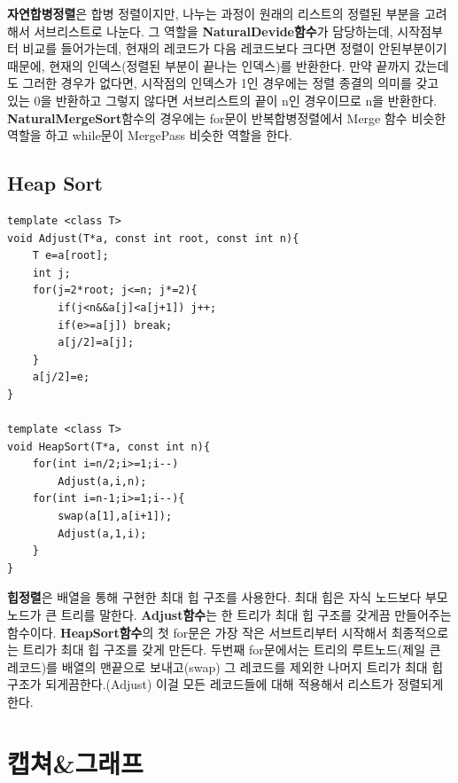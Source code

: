 \documentclass[a4paper,11pt]{article}
\begin{document}
\textbf{자연합병정렬}은 합병 정렬이지만, 나누는 과정이 원래의 리스트의 정렬된 부분을 고려해서 서브리스트로 나눈다. 그 역할을 \textbf{NaturalDevide함수}가 담당하는데, 시작점부터 비교를 들어가는데, 현재의 레코드가 다음 레코드보다 크다면 정렬이 안된부분이기때문에, 현재의 인덱스(정렬된 부분이 끝나는 인덱스)를 반환한다. 만약 끝까지 갔는데도 그러한 경우가 없다면, 시작점의 인덱스가 1인 경우에는 정렬 종결의 의미를 갖고 있는 0을 반환하고 그렇지 않다면 서브리스트의 끝이 n인 경우이므로 n을 반환한다. \textbf{NaturalMergeSort}함수의 경우에는 for문이 반복합병정렬에서 Merge 함수 비슷한 역할을 하고 while문이 MergePass 비슷한 역할을 한다. 

\subsection{Heap Sort}
\begin{Verbatim}
template <class T>
void Adjust(T*a, const int root, const int n){
    T e=a[root];
    int j;
    for(j=2*root; j<=n; j*=2){
        if(j<n&&a[j]<a[j+1]) j++;
        if(e>=a[j]) break;
        a[j/2]=a[j];
    }
    a[j/2]=e;
}

template <class T>
void HeapSort(T*a, const int n){
    for(int i=n/2;i>=1;i--)
        Adjust(a,i,n);
    for(int i=n-1;i>=1;i--){
        swap(a[1],a[i+1]);
        Adjust(a,1,i);
    }
}
\end{Verbatim}

\textbf{힙정렬}은 배열을 통해 구현한 최대 힙 구조를 사용한다. 최대 힙은 자식 노드보다 부모노드가 큰 트리를 말한다. \textbf{Adjust함수}는 한 트리가 최대 힙 구조를 갖게끔 만들어주는 함수이다. \textbf{HeapSort함수}의 첫 for문은 가장 작은 서브트리부터 시작해서 최종적으로는 트리가 최대 힙 구조를 갖게 만든다. 두번째 for문에서는 트리의 루트노드(제일 큰 레코드)를 배열의 맨끝으로 보내고(swap) 그 레코드를 제외한 나머지 트리가 최대 힙 구조가 되게끔한다.(Adjust) 이걸 모든 레코드들에 대해 적용해서 리스트가 정렬되게 한다.
\newpage
\section{캡쳐\&그래프}
\end{document}
